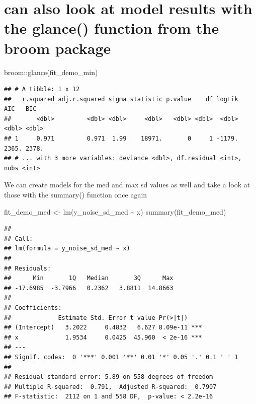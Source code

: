 \documentclass[
]{book}
\newenvironment{Shaded}{\begin{snugshade}}{\end{snugshade}}
\newcommand{\FunctionTok}[1]{\textcolor[rgb]{0.00,0.00,0.00}{#1}}
\newcommand{\NormalTok}[1]{#1}
\newcommand{\OtherTok}[1]{\textcolor[rgb]{0.56,0.35,0.01}{#1}}
\newcommand{\SpecialCharTok}[1]{\textcolor[rgb]{0.00,0.00,0.00}{#1}}
\begin{document}
\hypertarget{can-also-look-at-model-results-with-the-glance-function-from-the-broom-package}{%
\chapter{can also look at model results with the glance() function from the broom package}\label{can-also-look-at-model-results-with-the-glance-function-from-the-broom-package}}

\begin{Shaded}
\begin{Highlighting}[]
\NormalTok{broom}\SpecialCharTok{::}\FunctionTok{glance}\NormalTok{(fit\_demo\_min)}
\end{Highlighting}
\end{Shaded}

\begin{verbatim}
## # A tibble: 1 x 12
##   r.squared adj.r.squared sigma statistic p.value    df logLik   AIC   BIC
##       <dbl>         <dbl> <dbl>     <dbl>   <dbl> <dbl>  <dbl> <dbl> <dbl>
## 1     0.971         0.971  1.99    18971.       0     1 -1179. 2365. 2378.
## # ... with 3 more variables: deviance <dbl>, df.residual <int>, nobs <int>
\end{verbatim}

We can create models for the med and max sd values as well and take a look at those with the summary() function once again

\begin{Shaded}
\begin{Highlighting}[]
\NormalTok{fit\_demo\_med }\OtherTok{\textless{}{-}} \FunctionTok{lm}\NormalTok{(y\_noise\_sd\_med }\SpecialCharTok{\textasciitilde{}}\NormalTok{ x)}
\FunctionTok{summary}\NormalTok{(fit\_demo\_med)}
\end{Highlighting}
\end{Shaded}

\begin{verbatim}
## 
## Call:
## lm(formula = y_noise_sd_med ~ x)
## 
## Residuals:
##      Min       1Q   Median       3Q      Max 
## -17.6985  -3.7966   0.2362   3.8811  14.8663 
## 
## Coefficients:
##             Estimate Std. Error t value Pr(>|t|)    
## (Intercept)   3.2022     0.4832   6.627 8.09e-11 ***
## x             1.9534     0.0425  45.960  < 2e-16 ***
## ---
## Signif. codes:  0 '***' 0.001 '**' 0.01 '*' 0.05 '.' 0.1 ' ' 1
## 
## Residual standard error: 5.89 on 558 degrees of freedom
## Multiple R-squared:  0.791,  Adjusted R-squared:  0.7907 
## F-statistic:  2112 on 1 and 558 DF,  p-value: < 2.2e-16
\end{verbatim}
\end{document}
